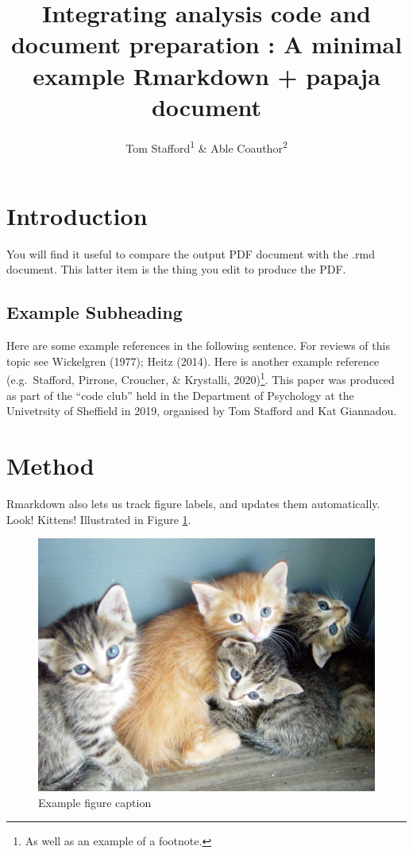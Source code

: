 \documentclass[
  english,
  ,jou,floatsintext]{apa6}
\title{Integrating analysis code and document preparation : A minimal example Rmarkdown + papaja document}
\author{Tom Stafford\textsuperscript{1} \& Able Coauthor\textsuperscript{2}}
\date{}
\affiliation{\vspace{0.5cm}\textsuperscript{1} University of Sheffield\\\textsuperscript{2} University of Bergen}
\begin{document}
\maketitle

\hypertarget{introduction}{%
\section{Introduction}\label{introduction}}

You will find it useful to compare the output PDF document with the .rmd document. This latter item is the thing you edit to produce the PDF.

\hypertarget{example-subheading}{%
\subsection{Example Subheading}\label{example-subheading}}

Here are some example references in the following sentence. For reviews of this topic see Wickelgren (1977); Heitz (2014). Here is another example reference (e.g.~Stafford, Pirrone, Croucher, \& Krystalli, 2020)\footnote{As well as an example of a footnote.}. This paper was produced as part of the \enquote{code club} held in the Department of Psychology at the Univetrsity of Sheffield in 2019, organised by Tom Stafford and Kat Giannadou.

\hypertarget{method}{%
\section{Method}\label{method}}

Rmarkdown also lets us track figure labels, and updates them automatically. Look! Kittens! Illustrated in Figure \ref{fig:examplefigurename}.

\begin{figure}

{\centering \includegraphics[width=0.75\linewidth]{figs/kittens} 

}

\caption{Example figure caption}\label{fig:examplefigurename}
\end{figure}
\end{document}
